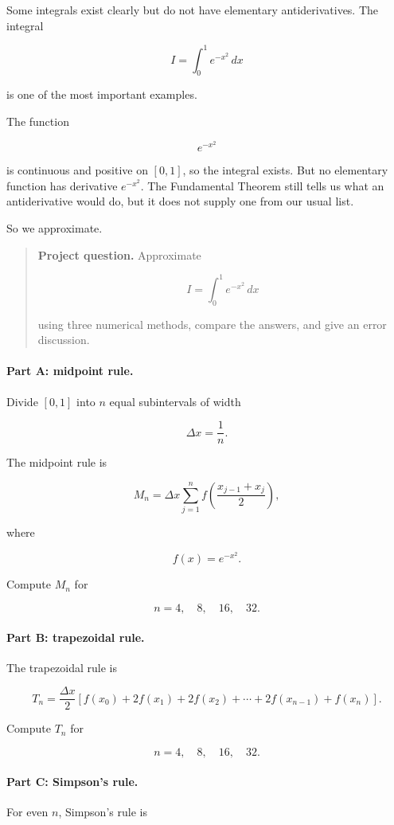 Some integrals exist clearly but do not have elementary antiderivatives.  The integral

\[
I=\int_0^1 e^{-x^2}\,dx
\]

is one of the most important examples.

The function

\[
e^{-x^2}
\]

is continuous and positive on \([0,1]\), so the integral exists.  But no elementary
function has derivative \(e^{-x^2}\).  The Fundamental Theorem still tells us what an
antiderivative would do, but it does not supply one from our usual list.

So we approximate.

\begin{quote}
\textbf{Project question.}
Approximate

\[
\boxed{
I=\int_0^1 e^{-x^2}\,dx
}
\]

using three numerical methods, compare the answers, and give an error discussion.
\end{quote}

\paragraph{Part A: midpoint rule.}
Divide \([0,1]\) into \(n\) equal subintervals of width

\[
\Delta x=\frac1n.
\]

The midpoint rule is

\[
\boxed{
M_n
=
\Delta x
\sum_{j=1}^{n}
f\left(\frac{x_{j-1}+x_j}{2}\right),
}
\]

where

\[
f(x)=e^{-x^2}.
\]

Compute \(M_n\) for

\[
n=4,\quad 8,\quad 16,\quad 32.
\]

\paragraph{Part B: trapezoidal rule.}
The trapezoidal rule is

\[
\boxed{
T_n
=
\frac{\Delta x}{2}
\left[
f(x_0)+2f(x_1)+2f(x_2)+\cdots+2f(x_{n-1})+f(x_n)
\right].
}
\]

Compute \(T_n\) for

\[
n=4,\quad 8,\quad 16,\quad 32.
\]

\paragraph{Part C: Simpson's rule.}
For even \(n\), Simpson's rule is

